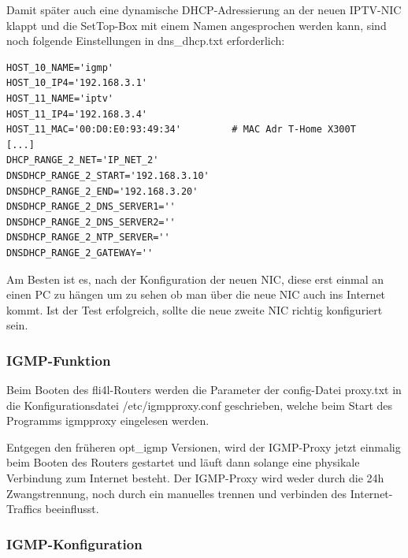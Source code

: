 Damit später auch eine dynamische DHCP-Adressierung an der neuen IPTV-NIC
klappt und die SetTop-Box mit einem Namen angesprochen werden kann, sind noch
folgende Einstellungen in dns\_dhcp.txt erforderlich:\\

\begin{example}
\begin{verbatim}
HOST_10_NAME='igmp'
HOST_10_IP4='192.168.3.1'
HOST_11_NAME='iptv'
HOST_11_IP4='192.168.3.4'
HOST_11_MAC='00:D0:E0:93:49:34'         # MAC Adr T-Home X300T
[...]
DHCP_RANGE_2_NET='IP_NET_2'
DNSDHCP_RANGE_2_START='192.168.3.10'
DNSDHCP_RANGE_2_END='192.168.3.20'
DNSDHCP_RANGE_2_DNS_SERVER1=''
DNSDHCP_RANGE_2_DNS_SERVER2=''
DNSDHCP_RANGE_2_NTP_SERVER=''
DNSDHCP_RANGE_2_GATEWAY=''
\end{verbatim}
\end{example}

Am Besten ist es, nach der Konfiguration der neuen NIC, diese erst einmal an einen
PC zu hängen um zu sehen ob man über die neue NIC auch ins Internet kommt. Ist
der Test erfolgreich, sollte die neue zweite NIC richtig konfiguriert sein.

\subsubsection{IGMP-Funktion}

Beim Booten des fli4l-Routers werden die Parameter der config-Datei proxy.txt in
die Konfigurationsdatei /etc/igmpproxy.conf geschrieben, welche beim Start des
Programms igmpproxy eingelesen werden.

Entgegen den früheren opt\_igmp Versionen, wird der IGMP-Proxy jetzt einmalig
beim Booten des Routers gestartet und läuft dann solange eine physikale
Verbindung zum Internet besteht. Der IGMP-Proxy wird weder durch die 24h
Zwangstrennung, noch durch ein manuelles trennen und verbinden des
Internet-Traffics beeinflusst.

\subsubsection{IGMP-Konfiguration}

